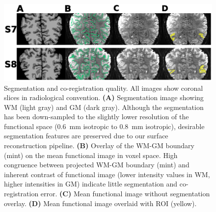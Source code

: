 \begin{figure}[htbp!]
\centering
\includegraphics[width=\textwidth]{figures/chapter_03_SI/figS12.eps}
\caption{Segmentation and co-registration quality. All images show coronal slices in radiological convention. \textbf{(A)} Segmentation image showing WM (light gray) and GM (dark gray). Although the segmentation has been down-sampled to the slightly lower resolution of the functional space (0.6~mm isotropic to 0.8~mm isotropic), desirable segmentation features are preserved due to our surface reconstruction pipeline. \textbf{(B)} Overlay of the WM-GM boundary (mint) on the mean functional image in voxel space. High congruence between projected WM-GM boundary (mint) and inherent contrast of functional image (lower intensity values in WM, higher intensities in GM) indicate little segmentation and co-registration error. \textbf{(C)} Mean functional image without segmentation overlay. \textbf{(D)} Mean functional image overlaid with ROI (yellow).}
\label{fig:figC_segmQual}
\end{figure}

